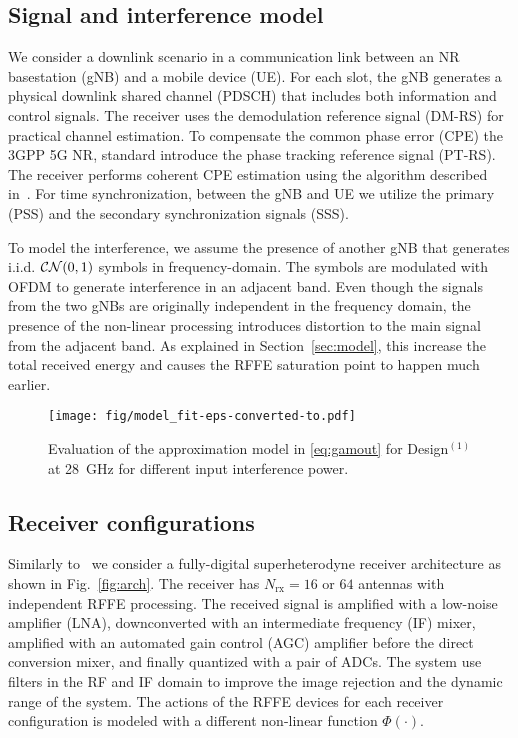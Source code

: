 \subsection{Signal and interference model}
We consider a downlink scenario in a communication link 
between an NR basestation (gNB) and a mobile device (UE). 
For each slot, the gNB generates a physical downlink shared
channel (PDSCH) that includes both information and control 
signals. The receiver uses the demodulation reference 
signal (DM-RS) for practical channel estimation. 
To compensate the common phase error (CPE) the 3GPP 5G NR,
standard introduce the phase tracking reference signal (PT-RS). 
The receiver performs coherent CPE estimation using the algorithm 
described in~\cite{syrjala2019phase}. For time synchronization,
between the gNB and UE we utilize the primary (PSS) and the secondary synchronization signals (SSS).

To model the interference, we assume the presence of another gNB
that generates i.i.d. $\mathcal{CN}(0, 1)$ symbols in frequency-domain. The
symbols are modulated with OFDM to generate interference in an
adjacent band. Even though the signals from the two gNBs are
originally independent in the frequency domain, the presence of 
the non-linear processing introduces distortion to the main signal
from the adjacent band. As explained in Section~\ref{sec:model},
this increase the total received energy and causes the RFFE 
saturation point to happen much earlier.

%
%
     
\begin{figure}[t]
    \centering
    \texttt{[image: fig/model\_fit-eps-converted-to.pdf]}
    \caption{Evaluation of the approximation model in \eqref{eq:gamout} for Design$^{(1)}$ at \SI{28}{GHz} for different input interference power.}
    \label{fig:model_fit}
\end{figure}



\subsection{Receiver configurations}
Similarly to~\cite{skrimponis2021towards} we consider a fully-digital superheterodyne receiver architecture as shown in Fig.~\ref{fig:arch}. The receiver has $N_\mathrm{rx}=16$ or $64$ antennas with independent RFFE processing. The received signal is amplified with a low-noise amplifier  (LNA), downconverted with an intermediate frequency (IF) mixer, amplified with an automated gain control (AGC) amplifier before the direct conversion mixer, and finally quantized with a pair of ADCs. The system use filters in the RF and IF domain to improve the image rejection and the dynamic range of the system. The actions of the RFFE devices for each receiver configuration is modeled with a different non-linear function $\Phi(\cdot)$.

